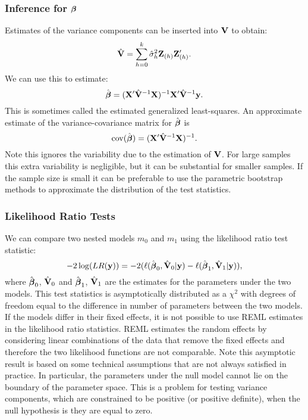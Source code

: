 \subsubsection{Inference for $\mbox{\boldmath $\beta$}$}
Estimates of the variance components can be inserted into $\mathbf{V}$ to obtain:
$$\hat {\mathbf{V}}  =  \sum_{h=0}^k \hat \sigma^2_h \mathbf{Z}_{(h)} \mathbf{Z}_{(h)}' .$$
We can use this to estimate:
$$
\hat {\mbox{\boldmath $\beta$}} = (\mathbf{X}' {\hat {\mathbf{V}}}^{-1} \mathbf{X})^{-1} \mathbf{X}' {\hat {\mathbf{V}}}^{-1} \mathbf{y}. 
$$
This is sometimes called the estimated generalized least-squares.
An approximate estimate of the variance-covariance matrix for $\hat {\mbox{\boldmath $\beta$}}$ is
$$\mathrm{cov} (\hat {\mbox{\boldmath $\beta$}})  =   (\mathbf{X}' {\hat {\mathbf{V}}}^{-1} \mathbf{X})^{-1} .$$
Note this ignores the variability due to the estimation of $\mathbf{V}$.
For large samples this extra variability is negligible, but it can be substantial for smaller samples.
If the sample size is small it can be preferable to use the parametric bootstrap methods to approximate the distribution of the test statistics.

\subsubsection{Likelihood Ratio Tests}
We can compare two nested models $m_0$ and $m_1$ using the likelihood ratio test statistic:
$$
-2 \log(LR(\mathbf{y})) = -2(\ell(\hat {\mbox{\boldmath $\beta$}}_0, \hat {\mathbf{V}}_0 | \mathbf{y} ) - \ell(\hat {\mbox{\boldmath $\beta$}}_1, \hat {\mathbf{V}}_1 | \mathbf{y} )), 
$$
where $\hat {\mbox{\boldmath $\beta$}}_0$, $\hat {\mathbf{V}}_0$  and $\hat {\mbox{\boldmath $\beta$}}_1$, $\hat {\mathbf{V}}_1$ are the estimates for the parameters under the two models. 
This test statistics is asymptotically distributed as a $\chi^2$ with degrees of freedom equal to the difference in number of parameters between the two models. 
If the models differ in their fixed effects, it is not possible to use REML estimates in the likelihood ratio statistics.
REML estimates the random effects by considering linear combinations of the data that remove the fixed effects and therefore the two likelihood functions are not comparable. 
Note this asymptotic result is based on some technical assumptions that are not always satisfied in practice. 
In particular, the parameters under the null model cannot lie on the boundary of the parameter space. 
This is a problem for testing variance components, which are constrained to be positive (or positive definite), when the null hypothesis is they are equal to zero. 


